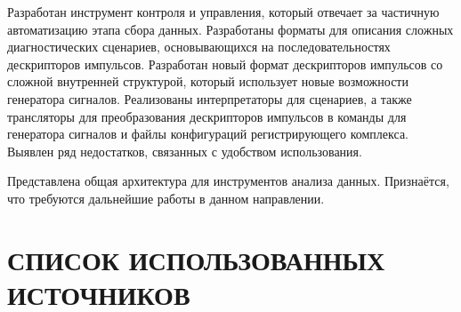 \documentclass{report}
\begin{document}
Разработан инструмент контроля и управления, который отвечает за частичную автоматизацию этапа сбора данных. Разработаны форматы для описания сложных диагностических сценариев, основывающихся на последовательностях дескрипторов импульсов. Разработан новый формат дескрипторов импульсов со сложной внутренней структурой, который использует новые возможности генератора сигналов. Реализованы интерпретаторы для сценариев, а также трансляторы для преобразования дескрипторов импульсов в команды для генератора сигналов и файлы конфигураций регистрирующего комплекса. Выявлен ряд недостатков, связанных с удобством использования.

Представлена общая архитектура для инструментов анализа данных. Признаётся, что требуются дальнейшие работы в данном направлении.

\chapter*{СПИСОК ИСПОЛЬЗОВАННЫХ ИСТОЧНИКОВ}
\end{document}
